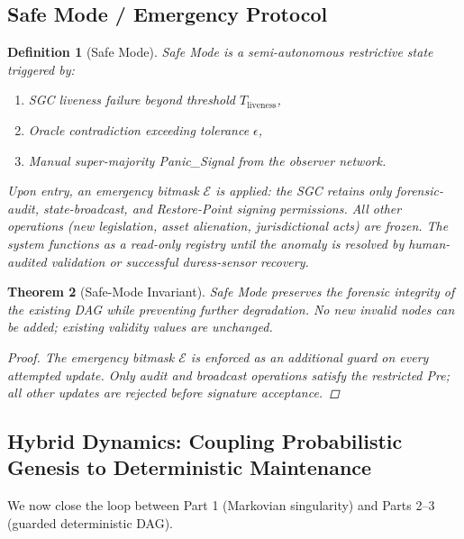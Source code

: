 \documentclass[11pt,a4paper]{article}
\newtheorem{theorem}{Theorem}[section]
\newtheorem{definition}[theorem]{Definition}
\begin{document}
\subsection{Safe Mode / Emergency Protocol}

\begin{definition}[Safe Mode]
Safe Mode is a semi-autonomous restrictive state triggered by:

\begin{enumerate}
\item SGC liveness failure beyond threshold \(T_{\text{liveness}}\),

\item Oracle contradiction exceeding tolerance \(\epsilon\),

\item Manual super-majority Panic\_Signal from the observer network.
\end{enumerate}

Upon entry, an emergency bitmask \(\mathcal{E}\) is applied: the SGC retains only forensic-audit, state-broadcast, and Restore-Point signing permissions. All other operations (new legislation, asset alienation, jurisdictional acts) are frozen. The system functions as a read-only registry until the anomaly is resolved by human-audited validation or successful duress-sensor recovery.
\end{definition}

\begin{theorem}[Safe-Mode Invariant]
Safe Mode preserves the forensic integrity of the existing DAG while preventing further degradation. No new invalid nodes can be added; existing validity values are unchanged.

\begin{proof}
The emergency bitmask \(\mathcal{E}\) is enforced as an additional guard on every attempted update. Only audit and broadcast operations satisfy the restricted Pre; all other updates are rejected before signature acceptance.
\end{proof}
\end{theorem}

\subsection{Hybrid Dynamics: Coupling Probabilistic Genesis to Deterministic Maintenance}

We now close the loop between Part 1 (Markovian singularity) and Parts 2--3 (guarded deterministic DAG).
\end{document}
